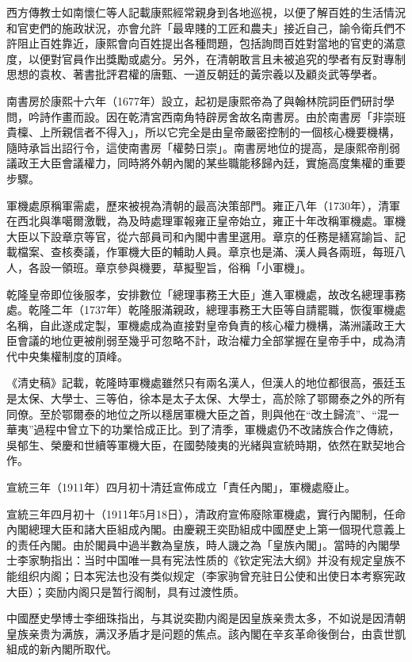 西方傳教士如南懷仁等人記載康熙經常親身到各地巡視，以便了解百姓的生活情況和官吏們的施政狀況，亦會允許「最卑賤的工匠和農夫」接近自己，諭令衛兵們不許阻止百姓靠近，康熙會向百姓提出各種問題，包括詢問百姓對當地的官吏的滿意度，以便對官員作出獎勵或處分。另外，在清朝敢言且未被追究的學者有反對專制思想的袁枚、著書批評君權的唐甄、一道反朝廷的黃宗羲以及顧炎武等學者。

南書房於康熙十六年（1677年）設立，起初是康熙帝為了與翰林院詞臣們研討學問，吟詩作畫而設。因在乾清宮西南角特辟房舍故名南書房。由於南書房「非崇班貴檁、上所親信者不得入」，所以它完全是由皇帝嚴密控制的一個核心機要機構，隨時承旨出詔行令，這使南書房「權勢日崇」。南書房地位的提高，是康熙帝削弱議政王大臣會議權力，同時將外朝內閣的某些職能移歸內廷，實施高度集權的重要步驟。

軍機處原稱軍需處，歷來被視為清朝的最高決策部門。雍正八年（1730年），清軍在西北與準噶爾激戰，為及時處理軍報雍正皇帝始立，雍正十年改稱軍機處。軍機大臣以下設章京等官，從六部員司和內閣中書里選用。章京的任務是繕寫諭旨、記載檔案、查核奏議，作軍機大臣的輔助人員。章京也是滿、漢人員各兩班，每班八人，各設一領班。章京參與機要，草擬聖旨，俗稱「小軍機」。

乾隆皇帝即位後服孝，安排數位「總理事務王大臣」進入軍機處，故改名總理事務處。乾隆二年（1737年）乾隆服滿親政，總理事務王大臣等自請罷職，恢復軍機處名稱，自此遂成定製，軍機處成為直接對皇帝負責的核心權力機構，滿洲議政王大臣會議的地位更被削弱至幾乎可忽略不計，政治權力全部掌握在皇帝手中，成為清代中央集權制度的頂峰。

《清史稿》記載，乾隆時軍機處雖然只有兩名漢人，但漢人的地位都很高，張廷玉是太保、大學士、三等伯，徐本是太子太保、大學士，高於除了鄂爾泰之外的所有同僚。至於鄂爾泰的地位之所以穩居軍機大臣之首，則與他在“改土歸流”、“混一華夷”過程中曾立下的功業恰成正比。到了清季，軍機處仍不改諸族合作之傳統，吳郁生、榮慶和世續等軍機大臣，在國勢陵夷的光緒與宣統時期，依然在默契地合作。

宣統三年（1911年）四月初十清廷宣佈成立「責任內閣」，軍機處廢止。

宣統三年四月初十（1911年5月18日），清政府宣佈廢除軍機處，實行內閣制，任命內閣總理大臣和諸大臣組成內閣。由慶親王奕劻組成中國歷史上第一個現代意義上的责任內閣。由於閣員中過半數為皇族，時人譏之為「皇族內閣」。當時的內閣學士李家駒指出：当时中国唯一具有宪法性质的《钦定宪法大纲》并没有规定皇族不能组织内阁；日本宪法也没有类似规定（李家驹曾充驻日公使和出使日本考察宪政大臣）；奕励内阁只是暂行阁制，具有过渡性质。

中國歷史學博士李细珠指出，与其说奕勘内阁是因皇族亲贵太多，不如说是因清朝皇族亲贵为满族，满汉矛盾才是问题的焦点。該內閣在辛亥革命後倒台，由袁世凱組成的新內閣所取代。

